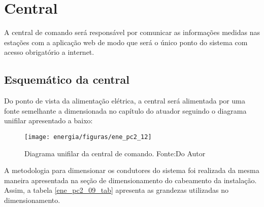 \section{Central}

A central de comando será responsável por comunicar as informações medidas nas estações com a aplicação web de modo que será o único ponto do sistema com acesso obrigatório a internet. 

\subsection{Esquemático da central}

Do ponto de vista da alimentação elétrica, a central será alimentada por uma fonte semelhante a dimensionada no capítulo do atuador seguindo o diagrama unifilar apresentado a baixo:

\begin{figure}[H]
		\centering
		\texttt{[image: energia/figuras/ene\_pc2\_12]}
		\caption{Diagrama unifilar da central de comando. Fonte:Do Autor}
		\label{ene_pc2_12}
\end{figure}

A metodologia para dimensionar os condutores do sistema foi realizada da mesma maneira apresentada na seção de dimensionamento do cabeamento da instalação. Assim, a tabela \ref{ene_pc2_09_tab} apresenta as grandezas utilizadas no dimensionamento.

\begin{table}[H]
\caption{Dimensionamento do cabeamento de força da central.}
\label{ene_pc2_09_tab}
\end{table}

